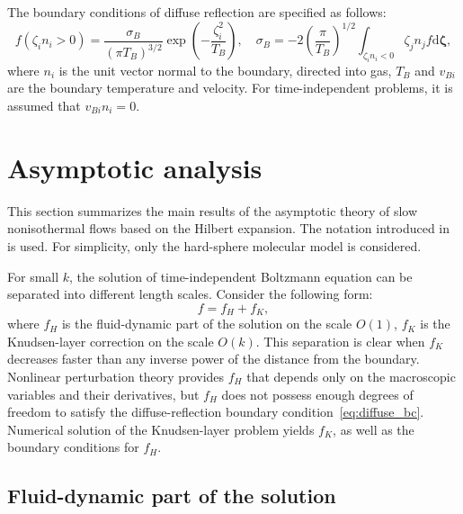 \documentclass[10pt]{article}
\newcommand{\dd}{\mathrm{d}}
\newcommand{\dzeta}{\boldsymbol{\dd\zeta}}
\newcommand{\OO}[1]{O(#1)}
\begin{document}
The boundary conditions of diffuse reflection are specified as follows:
\begin{equation}\label{eq:diffuse_bc}
    f\left(\zeta_i n_i > 0\right) =
        \frac{\sigma_B}{(\pi T_B)^{3/2}} \exp\left(-\frac{\zeta_i^2}{T_B}\right), \quad
    \sigma_B = -2\left(\frac{\pi}{T_B}\right)^{1/2} \int_{\zeta_i n_i < 0} \zeta_j n_j f\dzeta,
\end{equation}
where \(n_i\) is the unit vector normal to the boundary, directed into gas,
\(T_B\) and \(v_{Bi}\) are the boundary temperature and velocity.
For time-independent problems, it is assumed that \(v_{Bi}n_i = 0\).

\section{Asymptotic analysis}

This section summarizes the main results of the asymptotic theory of slow nonisothermal flows
based on the Hilbert expansion.
The notation introduced in~\cite{Sone2002, Sone2007} is used.
For simplicity, only the hard-sphere molecular model is considered.

For small \(k\), the solution of time-independent Boltzmann equation can be separated
into different length scales. Consider the following form:
\begin{equation}\label{eq:sum_solutions}
    f = f_H + f_K,
\end{equation}
where \(f_H\) is the fluid-dynamic part of the solution on the scale \(\OO{1}\),
\(f_K\) is the Knudsen-layer correction on the scale \(\OO{k}\).
This separation is clear when \(f_K\) decreases faster than any inverse power of the distance from the boundary.
Nonlinear perturbation theory provides \(f_H\) that depends only on the macroscopic variables and their derivatives,
but \(f_H\) does not possess enough degrees of freedom to satisfy the diffuse-reflection boundary condition~\eqref{eq:diffuse_bc}.
Numerical solution of the Knudsen-layer problem yields \(f_K\), as well as the boundary conditions for \(f_H\).

\subsection{Fluid-dynamic part of the solution}
\end{document}
